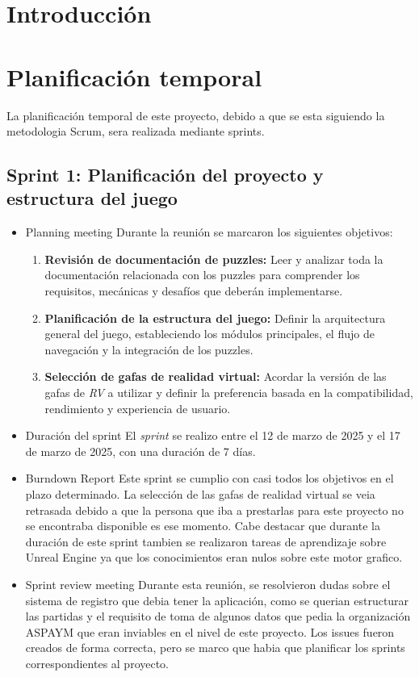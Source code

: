 
\section{Introducción}

\section{Planificación temporal}
La planificación temporal de este proyecto, debido a que se esta siguiendo la metodologia Scrum, sera realizada mediante sprints.

\subsection{\textbf{Sprint 1: Planificación del proyecto y estructura del juego}}
\begin{itemize}
\item {Planning meeting}
Durante la reunión se marcaron los siguientes objetivos:

\begin{enumerate}
\item \textbf{Revisión de documentación de puzzles:}
  Leer y analizar toda la documentación relacionada con los puzzles para comprender los requisitos,  
  mecánicas y desafíos que deberán implementarse.

\item \textbf{Planificación de la estructura del juego:}
  Definir la arquitectura general del juego, estableciendo los módulos  
  principales, el flujo de navegación y la integración de los puzzles.

\item \textbf{Selección de gafas de realidad virtual:}
  Acordar la versión de las gafas de \textit{RV} a utilizar y definir la  
  preferencia basada en la compatibilidad, rendimiento y experiencia de usuario.
\end{enumerate}

    \item {Duración del sprint}
El \textit{sprint } se realizo entre el 12 de marzo de 2025 y el 17 de marzo de 2025, con una duración de 7 días.

    \item {Burndown Report}
Este sprint se cumplio con casi todos los objetivos en el plazo determinado. La selección de las gafas de realidad virtual se veia retrasada debido a que la persona que iba a prestarlas para este proyecto no se encontraba disponible es ese momento. Cabe destacar que durante la duración de este sprint tambien se realizaron tareas de aprendizaje sobre Unreal Engine ya que los conocimientos eran nulos sobre este motor grafico. 

    \item {Sprint review meeting}
Durante esta reunión, se resolvieron  dudas sobre el sistema de registro que debia tener la aplicación, como se querian estructurar las partidas y el requisito de toma de algunos datos que pedia la organización ASPAYM que eran inviables en el nivel de este proyecto. Los issues fueron creados de forma correcta, pero se marco que habia que planificar los sprints correspondientes al proyecto.
\end{itemize}

